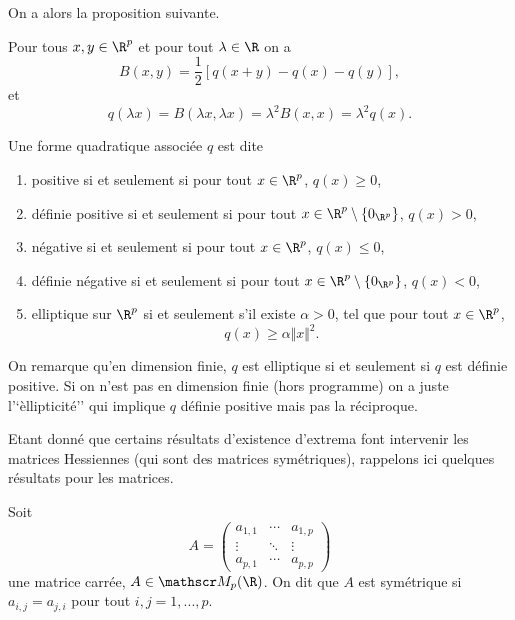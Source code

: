 \documentclass[class=report,crop=false]{standalone}
\begin{document}
\noindent On a alors la proposition suivante. 

\begin{proposition}
\textcolor[rgb]{0.44,0.00,0.87}{
 Pour tous $x,y \in \R^p$ et pour tout $\lambda \in \R$ on a 
 \begin{equation*}
B(x,y)=\dfrac{1}{2}[q(x+y)-q(x)-q(y)],
\end{equation*}
et 
 \begin{equation*}
q(\lambda x)=B(\lambda x, \lambda x)= \lambda^2B(x,x)=\lambda^2q(x).
\end{equation*}
 }
\end{proposition}

\begin{definition}
\textcolor[rgb]{0.98,0.00,0.00}{
Une forme quadratique associée $q$ est dite
\begin{enumerate}
\item positive si et seulement si pour tout $x \in \R^p$, $q(x) \geq 0$,
\item définie positive si et seulement si pour tout $x \in \R^p \setminus \left\{0_{\R^p}\right\}$, $q(x)>0$,
\item négative si et seulement si pour tout $x \in \R^p$, $q(x) \leq 0$,
\item définie négative si et seulement si pour tout $x \in \R^p \setminus \left\{0_{\R^p}\right\}$, $q(x)<0$,
\item elliptique sur $\R^p$ si et seulement s'il existe $\alpha >0$, tel que pour tout $x \in \R^p$, 
\begin{equation}
q(x) \geq \alpha \Vert x \Vert^2.
\end{equation}
\end{enumerate} 
}
\end{definition}

\begin{remarque*}
\textcolor[rgb]{0.00,0.00,1.00}{
  On remarque qu'en dimension finie, $q$ est elliptique si et seulement si $q$ est définie positive. Si on n'est pas en dimension finie (hors programme) on a juste l'`èllipticité'' qui implique $q$ définie positive mais pas la réciproque.}
\end{remarque*}

\noindent Etant donné que certains résultats d'existence d'extrema font intervenir les matrices Hessiennes (qui sont des matrices symétriques), rappelons ici quelques résultats pour les matrices. 
\begin{definition} 
\textcolor[rgb]{0.98,0.00,0.00}{
  Soit
  \begin{equation*}
  A=\left(\begin{matrix}
a_{1,1} & \cdots & a_{1,p} \\ 
\vdots & \ddots & \vdots \\ 
a_{p,1} & \cdots & a_{p,p}
\end{matrix} \right)
  \end{equation*}
  une matrice carrée, $A \in \mat_p(\R)$. On dit que $A$ est symétrique si $a_{i,j}=a_{j,i}$
  pour tout $i,j=1,...,p$.}
\end{definition}
\end{document}
